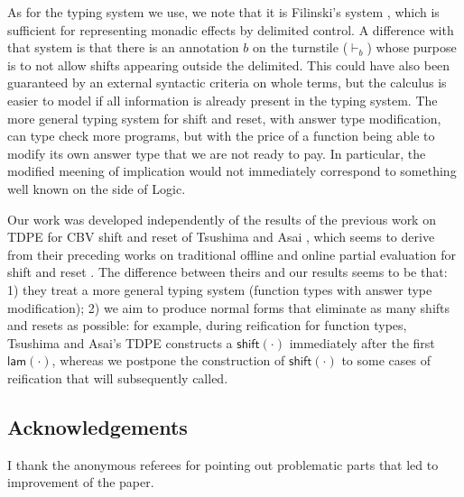 \documentclass{eptcs}
\newcommand{\lam}[1]{\mathsf{lam}{(#1)}}
\newcommand{\shift}[1]{\mathsf{shift}{(#1)}}
\theoremstyle{definition}
\theoremstyle{plain}
\theoremstyle{remark}
\begin{document}
As for the typing system we use, we note that it is Filinski's system \cite{FilinskiThesis}, which is sufficient for representing monadic effects by delimited control. A difference with that system is that there is an annotation $b$ on the turnstile ($\vdash_b$) whose purpose is to not allow shifts appearing outside the delimited. This could have also been guaranteed by an external syntactic criteria on whole terms, but the calculus is easier to model if all information is already present in the typing system. The more general typing system for shift and reset, with answer type modification, can type check more programs, but with the price of a function being able to modify its own answer type that we are not ready to pay. In particular, the modified meening of implication would not immediately correspond to something well known on the side of Logic.

Our work was developed independently of the results of the previous work on TDPE for CBV shift and reset of Tsushima and Asai \cite{TsushimaAsai2009}, which seems to derive from their preceding works on traditional offline and online partial evaluation for shift and reset \cite{Asai2002,Asai2004}. The difference between theirs and our results seems to be that: 1) they treat a more general typing system (function types with answer type modification); 2) we aim to produce normal forms that eliminate as many shifts and resets as possible: for example, during reification for function types, Tsushima and Asai's TDPE constructs a $\shift{\cdot}$ immediately after the first $\lam{\cdot}$, whereas we postpone the construction of $\shift{\cdot}$ to some cases of reification that will subsequently called.

\subsection*{Acknowledgements}
I thank the anonymous referees for pointing out problematic parts that led to improvement of the paper. 



\end{document}
